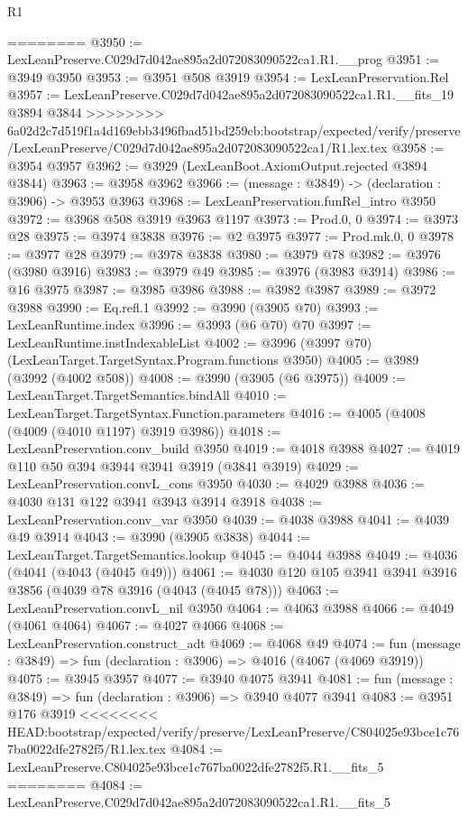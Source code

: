 \begin{lexlean}{R1}
\begin{coremodule}
{{{{{{{{{{{{{{{{{{{{{{{{{{{{{{{{{{{{{{{{{{{{{{{{{{{{{{{{{{{{{{{{{{{{{{{{{{{{{{{{{{{{{{{{{{{{{{{{{{{{{{{{{{{{{{{{{{{{{{{{{{{{{{{{{{{{{{{{{{{{{{{{{{{{{{{{{{{{{{{{{{{{{{{{{{{{{{{{{{{{{{{{{{========
@3950 := LexLeanPreserve.C029d7d042ae895a2d072083090522ca1.R1.__prog
@3951 := @3949 @3950
@3953 := @3951 @508 @3919
@3954 := LexLeanPreservation.Rel
@3957 := LexLeanPreserve.C029d7d042ae895a2d072083090522ca1.R1.__fits_19 @3894 @3844
>>>>>>>> 6a02d2c7d519f1a4d169ebb3496fbad51bd259cb:bootstrap/expected/verify/preserve/LexLeanPreserve/C029d7d042ae895a2d072083090522ca1/R1.lex.tex
@3958 := @3954 @3957
@3962 := @3929 (LexLeanBoot.AxiomOutput.rejected @3894 @3844)
@3963 := @3958 @3962
@3966 := (message : @3849) -> (declaration : @3906) -> @3953 @3963
@3968 := LexLeanPreservation.funRel_intro @3950
@3972 := @3968 @508 @3919 @3963 @1197
@3973 := Prod.{0, 0}
@3974 := @3973 @28
@3975 := @3974 @3838
@3976 := @2 @3975
@3977 := Prod.mk.{0, 0}
@3978 := @3977 @28
@3979 := @3978 @3838
@3980 := @3979 @78
@3982 := @3976 (@3980 @3916)
@3983 := @3979 @49
@3985 := @3976 (@3983 @3914)
@3986 := @16 @3975
@3987 := @3985 @3986
@3988 := @3982 @3987
@3989 := @3972 @3988
@3990 := Eq.refl.{1}
@3992 := @3990 (@3905 @70)
@3993 := LexLeanRuntime.index
@3996 := @3993 (@6 @70) @70
@3997 := LexLeanRuntime.instIndexableList
@4002 := @3996 (@3997 @70) (LexLeanTarget.TargetSyntax.Program.functions @3950)
@4005 := @3989 (@3992 (@4002 @508))
@4008 := @3990 (@3905 (@6 @3975))
@4009 := LexLeanTarget.TargetSemantics.bindAll
@4010 := LexLeanTarget.TargetSyntax.Function.parameters
@4016 := @4005 (@4008 (@4009 (@4010 @1197) @3919 @3986))
@4018 := LexLeanPreservation.conv_build @3950
@4019 := @4018 @3988
@4027 := @4019 @110 @50 @394 @3944 @3941 @3919 (@3841 @3919)
@4029 := LexLeanPreservation.convL_cons @3950
@4030 := @4029 @3988
@4036 := @4030 @131 @122 @3941 @3943 @3914 @3918
@4038 := LexLeanPreservation.conv_var @3950
@4039 := @4038 @3988
@4041 := @4039 @49 @3914
@4043 := @3990 (@3905 @3838)
@4044 := LexLeanTarget.TargetSemantics.lookup
@4045 := @4044 @3988
@4049 := @4036 (@4041 (@4043 (@4045 @49)))
@4061 := @4030 @120 @105 @3941 @3941 @3916 @3856 (@4039 @78 @3916 (@4043 (@4045 @78)))
@4063 := LexLeanPreservation.convL_nil @3950
@4064 := @4063 @3988
@4066 := @4049 (@4061 @4064)
@4067 := @4027 @4066
@4068 := LexLeanPreservation.construct_adt
@4069 := @4068 @49
@4074 := fun (message : @3849) => fun (declaration : @3906) => @4016 (@4067 (@4069 @3919))
@4075 := @3945 @3957
@4077 := @3940 @4075 @3941
@4081 := fun (message : @3849) => fun (declaration : @3906) => @3940 @4077 @3941
@4083 := @3951 @176 @3919
<<<<<<<< HEAD:bootstrap/expected/verify/preserve/LexLeanPreserve/C804025e93bce1c767ba0022dfe2782f5/R1.lex.tex
@4084 := LexLeanPreserve.C804025e93bce1c767ba0022dfe2782f5.R1.__fits_5
========
@4084 := LexLeanPreserve.C029d7d042ae895a2d072083090522ca1.R1.__fits_5
}}}}}}}}}}}}}}}}}}}}}}}}}}}}}}}}}}}}}}}}}}}}}}}}}}}}}}}}}}}}}}}}}}}}}}}}}}}}}}}}}}}}}}}}}}}}}}}}}}}}}}}}}}}}}}}}}}}}}}}}}}}}}}}}}}}}}}}}}}}}}}}}}}}}}}}}}}}}}}}}}}}}}}}}}}}}}}}}}}}}}}}}}}
\end{coremodule}
\end{lexlean}
